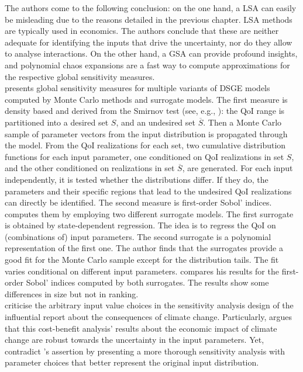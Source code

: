 The authors come to the following conclusion: on the one hand, a LSA can easily be misleading due to the reasons detailed in the previous chapter. LSA methods are typically used in economics. The authors conclude that these are neither adequate for identifying the inputs that drive the uncertainty, nor do they allow to analyse interactions. On the other hand, a GSA can provide profound insights, and polynomial chaos expansions are a fast way to compute approximations for the respective global sensitivity measures.\\
\newline
\cite{Ratto.2008} presents global sensitivity measures for multiple variants of DSGE models computed by Monte Carlo methods and surrogate models. The first measure is density based and derived from the Smirnov test (see, e.g., \cite{Hornberger.1981}): the QoI range is partitioned into a desired set $S$, and an undesired set $\overline{S}$. Then a Monte Carlo sample of parameter vectors from the input distribution is propagated through the model. From the QoI realizations for each set, two cumulative distribution functions for each input parameter, one conditioned on QoI realizations in set $S$, and the other conditioned on realizations in set $\overline{S}$, are generated. For each input independently, it is tested whether the distributions differ. If they do, the parameters and their specific regions that lead to the undesired QoI realizations can directly be identified. The second measure is first-order Sobol' indices. \citeauthor{Ratto.2008} computes them by employing two different surrogate models. The first surrogate is obtained by state-dependent regression. The idea is to regress the QoI on (combinations of) input parameters. The second surrogate is a polynomial representation of the first one. The author finds that the surrogates provide a good fit for the Monte Carlo sample except for the distribution tails. The fit varies conditional on different input parameters. \citeauthor{Ratto.2008} compares his results for the first-order Sobol' indices computed by both surrogates. The results show some differences in size but not in ranking.\\
\newline
\cite{Saltelli.2010} criticise the arbitrary input value choices in the sensitivity analysis design of the influential \cite{Stern.2007} report about the consequences of climate change. Particularly, \citeauthor{Stern.2007} argues that this cost-benefit analysis' results about the economic impact of climate change are robust towards the uncertainty in the input parameters. Yet, \cite{Saltelli.2010} contradict \citeauthor{Stern.2007}'s assertion by presenting a more thorough sensitivity analysis with parameter choices that better represent the original input distribution.\\

